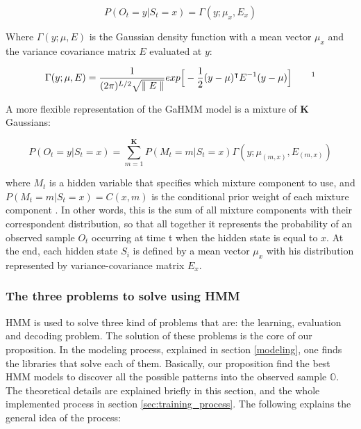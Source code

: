 \begin{equation}
P(O_t=y|S_t = x) = \Gamma  (y;\mu_x,E_x) 
\label{g_prob_gua_ec}
\end{equation}

Where $\Gamma  (y;\mu, E) $ is the Gaussian density function with a mean vector $\mu_x$ and the variance covariance matrix $E$ evaluated at $y$:   

\begin{equation}
\Gamma (y;\mu,E) =  \frac{1}{(2\pi)^{L/2} \sqrt{ \parallel E \parallel}} exp \Big[ -\frac{1}{2}(y - \mu)^{\intercal} E^{-1}(y - \mu) \Big]  \quad \quad  \text{\footnotemark} 
\label{density_function_b}
\end{equation} 


A more flexible representation of the GaHMM model is a mixture of $\mathbf{K}$ Gaussians:

\begin{equation}
P(O_t=y|S_t = x) = \sum_{m=1}^{\mathbf{K}} P(M_t=m|S_t=x) \Gamma(y;\mu_{(m,x)},E_{(m,x)})
\label{mixture_gausssian}
\end{equation}
 
where $M_t$ is a hidden variable that specifies which mixture component to use, and $P(M_t=m|S_t=x) = C(x,m)$ is the conditional prior weight of each mixture component \cite{murphy2002dynamic}. In other words, this is the sum of all mixture components with their correspondent distribution, so that all together it represents the probability of an observed sample $O_t$ occurring at time t when the hidden state is equal to $x$. At the end, each hidden state $S_{i}$ is defined by a mean vector $\mu_x$ with his distribution represented by variance-covariance matrix $E_x$.   


\subsubsection{The three problems to solve using HMM}
\label{sec:problems}

HMM is used to solve three kind of problems that are: the learning, evaluation and decoding problem. The solution of these problems is the core of our proposition. In the modeling process, explained in section \ref{modeling}, one finds the libraries that solve each of them. Basically, our proposition find the best HMM models to discover all the possible patterns into the observed sample $\mathbb{O}$. The theoretical details are explained briefly in this section, and the whole implemented process in section \ref{sec:training_process}. The following explains the general idea of the process:
  
